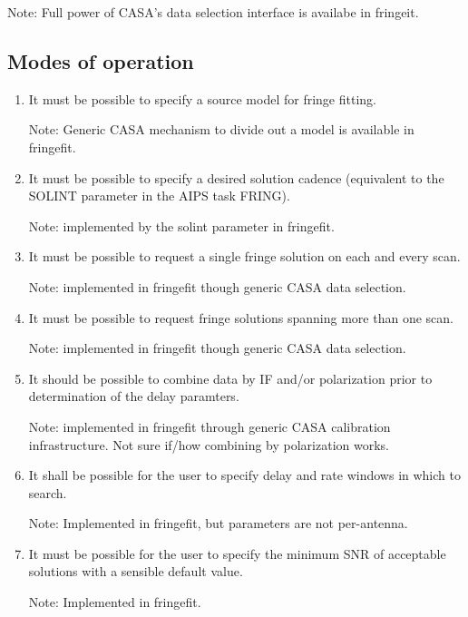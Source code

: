 \documentclass[11pt,a4paper]{article}
\begin{document}
Note: Full power of CASA's data selection interface is availabe in fringeit.

\subsection{Modes of operation}

\begin{enumerate}[subsubseclist]

\item It must be possible to specify a source model for fringe fitting.

  Note: Generic CASA mechanism to divide out a model is available in
  fringefit.

\item It must be possible to specify a desired solution cadence
  (equivalent to the SOLINT parameter in the AIPS task FRING).

  Note: implemented by the solint parameter in fringefit.

\item It must be possible to request a single fringe solution on each
  and every scan.

  Note: implemented in fringefit though generic CASA data selection.

\item It must be possible to request fringe solutions spanning more
  than one scan.

  Note: implemented in fringefit though generic CASA data selection.

\item It should be possible to combine data by IF and/or polarization
  prior to determination of the delay paramters.

  Note: implemented in fringefit through generic CASA calibration
  infrastructure.  Not sure if/how combining by polarization works.

\item It shall be possible for the user to specify delay and rate
  windows in which to search.

  Note: Implemented in fringefit, but parameters are not per-antenna.

\item It must be possible for the user to specify the minimum SNR of
  acceptable solutions with a sensible default value.

  Note: Implemented in fringefit.

\end{enumerate}
\end{document}
